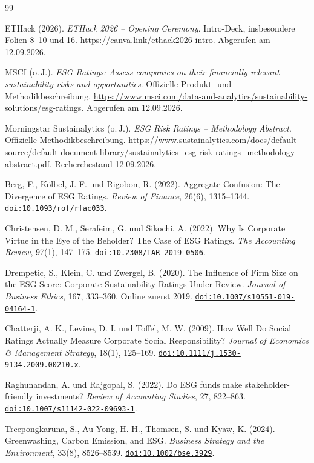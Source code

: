 \documentclass[11pt,a4paper]{article}
\newcommand{\doi}[1]{\href{https://doi.org/#1}{\nolinkurl{doi:#1}}}
\begin{document}
\newpage
\begin{thebibliography}{99}
\small
\raggedright
{} ETHack (2026). \emph{ETHack 2026 -- Opening Ceremony}. Intro-Deck, insbesondere Folien 8--10 und 16. \url{https://canva.link/ethack2026-intro}. Abgerufen am 12.09.2026.

 MSCI (o.\,J.). \emph{ESG Ratings: Assess companies on their financially relevant sustainability risks and opportunities}. Offizielle Produkt- und Methodikbeschreibung. \url{https://www.msci.com/data-and-analytics/sustainability-solutions/esg-ratings}. Abgerufen am 12.09.2026.

 Morningstar Sustainalytics (o.\,J.). \emph{ESG Risk Ratings -- Methodology Abstract}. Offizielle Methodikbeschreibung. \url{https://www.sustainalytics.com/docs/default-source/default-document-library/sustainalytics_esg-risk-ratings_methodology-abstract.pdf}. Recherchestand 12.09.2026.

 Berg, F., Kölbel, J. F. und Rigobon, R. (2022). Aggregate Confusion: The Divergence of ESG Ratings. \emph{Review of Finance}, 26(6), 1315--1344. \doi{10.1093/rof/rfac033}.

 Christensen, D. M., Serafeim, G. und Sikochi, A. (2022). Why Is Corporate Virtue in the Eye of the Beholder? The Case of ESG Ratings. \emph{The Accounting Review}, 97(1), 147--175. \doi{10.2308/TAR-2019-0506}.

 Drempetic, S., Klein, C. und Zwergel, B. (2020). The Influence of Firm Size on the ESG Score: Corporate Sustainability Ratings Under Review. \emph{Journal of Business Ethics}, 167, 333--360. Online zuerst 2019. \doi{10.1007/s10551-019-04164-1}.

 Chatterji, A. K., Levine, D. I. und Toffel, M. W. (2009). How Well Do Social Ratings Actually Measure Corporate Social Responsibility? \emph{Journal of Economics \& Management Strategy}, 18(1), 125--169. \doi{10.1111/j.1530-9134.2009.00210.x}.

 Raghunandan, A. und Rajgopal, S. (2022). Do ESG funds make stakeholder-friendly investments? \emph{Review of Accounting Studies}, 27, 822--863. \doi{10.1007/s11142-022-09693-1}.

 Treepongkaruna, S., Au Yong, H. H., Thomsen, S. und Kyaw, K. (2024). Greenwashing, Carbon Emission, and ESG. \emph{Business Strategy and the Environment}, 33(8), 8526--8539. \doi{10.1002/bse.3929}.


\end{thebibliography}
\end{document}
